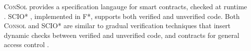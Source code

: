 \textsc{ConSol} \cite{consolidating-pldi2024}
provides a specification langauge for smart contracts,
checked at runtime \cite{FinFel01}.
SCIO* \cite{secure-io-fstar-popl2024}, implemented in
F*, supports both
verified and unverified code.
Both \textsc{Consol} and SCIO* are 
similar to gradual verification techniques 
\cite{gradual-verification-popl2024,Cok2022} that
insert dynamic checks between verified and unverified code,
and contracts for general access control 
\cite{DPCC14,AuthContract,cedar-oopsla2024}.




%


